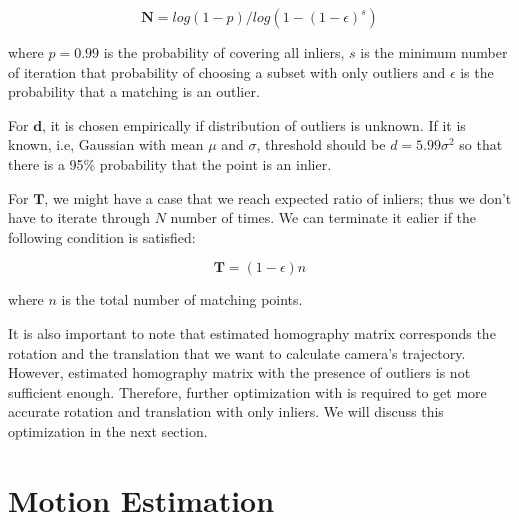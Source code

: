 \documentclass[a4paper]{report}
\numberwithin{figure}{section}
\begin{document}
\begin{equation}
  \mathbf{N} = log(1-p)/log(1-(1-\epsilon)^s)
\end{equation}

where $p=0.99$ is the probability of covering all inliers, $s$ is the 
minimum number of iteration that 
probability of choosing a subset with only outliers 
and $\epsilon$ is the probability that a matching is an outlier.

For $\mathbf{d}$, it is chosen empirically if distribution of outliers is unknown. If 
it is known, i.e, Gaussian with mean $\mu$ and $\sigma$, threshold should 
be $d=5.99\sigma^2$ so that there is a 95\% probability that the point is an inlier.

For $\mathbf{T}$, we might have a case that we reach expected ratio of inliers; thus 
we don't have to iterate through $N$ number of times. We can terminate it 
ealier if the following condition is satisfied:

\begin{equation}
  \mathbf{T} = (1-\epsilon)n
\end{equation}

where $n$ is the total number of matching points.

It is also important 
to note that estimated homography matrix corresponds the rotation and the 
translation that we want to calculate camera's trajectory. However, 
estimated homography matrix with the presence of outliers is not sufficient 
enough. Therefore, further optimization with is required to get more 
accurate rotation and translation with only inliers. We will discuss this 
optimization in the next section.


\section{Motion Estimation} \label{sc_motion_estim}
\end{document}
